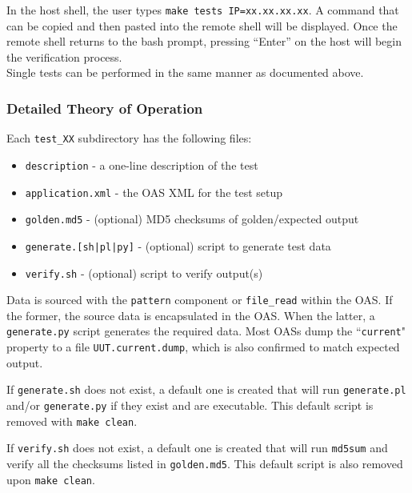 \documentclass{article}
\begin{document}
In the host shell, the user types \verb+make tests IP=xx.xx.xx.xx+. A command that can be copied and then pasted into the remote shell will be displayed. Once the remote shell returns to the bash prompt, pressing ``Enter'' on the host will begin the verification process. \\

Single tests can be performed in the same manner as documented above.

\subsubsection*{Detailed Theory of Operation}
\begin{flushleft}
  Each \verb+test_XX+ subdirectory has the following files:

  \begin{itemize}{}{}
    \item \texttt{description} - a one-line description of the test
    \item \texttt{application.xml} - the OAS XML for the test setup
    \item \texttt{golden.md5} - (optional) MD5 checksums of golden/expected output
    \item \texttt{generate.[sh|pl|py]} - (optional) script to generate test data
    \item \texttt{verify.sh} - (optional) script to verify output(s)
  \end{itemize}

	Data is sourced with the \verb+pattern+ component or \verb+file_read+ within the OAS. If the former, the source data is encapsulated in the OAS. When the latter, a \verb+generate.py+ script generates the required data. Most OASs dump the ``\texttt{current}" property to a file \verb+UUT.current.dump+, which is also confirmed to match expected output.
  \medskip

  If \texttt{generate.sh} does not exist, a default one is created that will run \texttt{generate.pl} and/or \texttt{generate.py} if they exist and are executable. This default script is removed with \verb+make clean+.
  \medskip

	If \texttt{verify.sh} does not exist, a default one is created that will run \texttt{md5sum} and verify all the checksums listed in \texttt{golden.md5}. This default script is also removed upon \verb+make clean+.
  \medskip
\end{flushleft}
\end{document}
